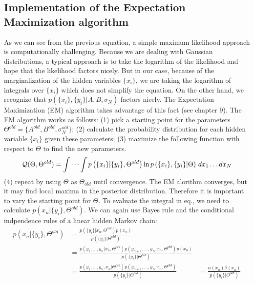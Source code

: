 \documentclass[%
 reprint,
 amsmath,amssymb,
 aps,
]{revtex4-1}
\begin{document}
\subsection{Implementation of the Expectation Maximization algorithm}
As we can see from the previous equation, a simple maximum likelihood approach is computationally challenging.  Because we are dealing with Gaussian distributions, a typical approach is to take the logarithm of the likelihood and hope that the likelihood factors nicely.  But in our case, because of the marginalization of the hidden variables $\{x_{i}\}$, we are taking the logarithm of integrals over $\{x_{i}\}$ which does not simplify the equation.  On the other hand, we recognize that $p\left( \{x_{i}\},\{y_{i}\}|A,B,\sigma_{N}\right)$ factors nicely.  The Expectation Maximization (EM) algorithm takes advantage of this fact (see \cite{RN90} chapter 9).  The EM algorithm works as follows: (1) pick a starting point for the parameters $\Theta^{old} = \{A^{old},B^{old},\sigma_{N}^{old}\}$; (2) calculate the probability distribution for each hidden variable $\{x_{i}\}$ given these parameters; (3) maximize the following function with respect to $\Theta$ to find the new parameters.
\begin{equation}
	\mathcal{Q}(\Theta,\Theta^{old}) = \idotsint p\left( \{x_{i}\}|\{y_{i}\},\Theta^{old}\right)\ln p\left( \{x_{i}\},\{y_{i}\}|\Theta\right)\,dx_1 \dots dx_N
\end{equation}
(4) repeat by using $\Theta$ as $\Theta_{old}$ until convergence.  The EM alorithm converges, but it may find local maxima in the posterior distribution.  Therefore it is important to vary the starting point for $\Theta$.  To evaluate the integral in eq., we need to calculate $p\left( x_{n}|\{y_{i}\},\Theta^{old}\right)$.  We can again use Bayes rule and the conditional indpendence rules of a linear hidden Markov chain:
\begin{equation}\label{margxn}
	\begin{aligned}
	p\left( x_{n}|\{y_{i}\},\Theta^{old}\right)&=\frac{p\left( \{y_{i}\}|x_{n},\Theta^{old}\right)p(x_{n})}{p(\{y_{i}\}|\Theta^{old})}\\
	&=\frac{p(y_{1},\dots,y_{n}|x_{n},\Theta^{old})p(y_{n+1},\dots,y_{N}|x_{n},\Theta^{old})p(x_{n})}{p(\{y_{i}\}|\Theta^{old})}\\
	&=\frac{p(y_{1},\dots,y_{n},x_{n}|\Theta^{old})p(y_{n+1},\dots,y_{N}|x_{n},\Theta^{old})}{p(\{y_{i}\}|\Theta^{old})}
	&=\frac{\alpha(x_{n})\beta(x_{n})}{p(\{y_{i}\}|\Theta^{old})}
	\end{aligned}
\end{equation}
\end{document}
